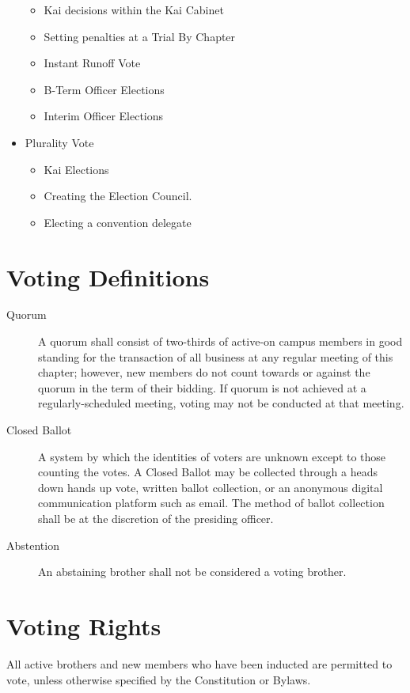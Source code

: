 \begin{itemize}
		\begin{itemize}
			\item Kai decisions within the Kai Cabinet
			\item Setting penalties at a Trial By Chapter
			\item Instant Runoff Vote
			\item B-Term Officer Elections
			\item Interim Officer Elections
		\end{itemize}
	\item[] Plurality Vote
		\begin{itemize}
			\item Kai Elections
			\item Creating the Election Council.
			\item Electing a convention delegate
		\end{itemize}
\end{itemize}

\section{Voting Definitions}
\label{sec:voting-definitions}

\begin{description} \item[Quorum] A quorum shall consist of two-thirds of
		active-on campus members in good standing for the transaction of all
		business at any regular meeting of this chapter; however, new members do
		not count towards or against the quorum in the term of their bidding.
		If quorum is
		not achieved at a regularly-scheduled meeting, voting may not be
		conducted at that meeting.

	\item[Closed Ballot] A system by which the identities of voters are unknown
		except to those counting the votes.
		A Closed Ballot may be collected through a heads down hands up vote,
		written ballot collection, or an anonymous digital communication
		platform such as email.
		The method of ballot collection shall be at the discretion of the
		presiding officer.

	\item[Abstention] An abstaining brother shall not be considered a voting
		brother.
\end{description}

\section{Voting Rights}
\label{sec:voting-rights}

All active brothers and new members who have been inducted are permitted to
vote, unless otherwise specified by the Constitution or Bylaws.

